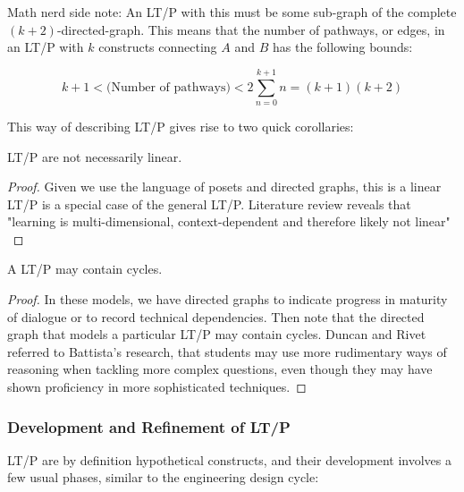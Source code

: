 \documentclass{TC}
\begin{document}
\begin{remark}
Math nerd side note: An LT/P with this must be some sub-graph of the complete $(k+2)$-directed-graph. This means that the number of pathways, or edges, in an LT/P with $k$ constructs connecting $A$ and $B$ has the following bounds:

$$ k+ 1 < \text{(Number of pathways)} < 2\sum_{n=0}^{k+1}n = (k+1)(k+2)$$ 

\end{remark}

This way of describing LT/P gives rise to two quick corollaries:

\begin{corollary}
 LT/P are not necessarily linear.
\begin{proof}Given we use the language of posets and directed graphs, this is a linear LT/P is a special case of the general LT/P. Literature review reveals that "learning is multi-dimensional, context-dependent and therefore likely not linear" \parencite{duncan_learning_2018}\end{proof}
\end{corollary}

\begin{corollary}
A LT/P may contain cycles.

\begin{proof}In these models, we have directed graphs to indicate progress in maturity of dialogue or to record technical dependencies. Then note that the directed graph that models a particular LT/P may contain cycles. Duncan and Rivet \parencite{duncan_learning_2018} referred to Battista's research, that students may use more rudimentary ways of reasoning when tackling more complex questions, even though they may have shown proficiency in more sophisticated techniques.
 \end{proof}
\end{corollary}
\subsubsection{Development and Refinement of LT/P}
LT/P are by definition hypothetical constructs, and their development involves a few usual phases, similar to the engineering design cycle:
\end{document}
